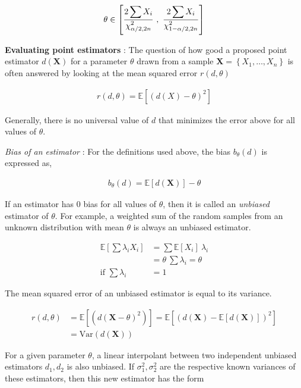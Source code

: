 \begin{align}
	\theta \in \left[\ddfrac{2 \sum X_i}{\chi^2_{\alpha/2, 2n}}\ ,\ \ddfrac{2 \sum X_i}{\chi^2_{1 - \alpha/2, 2n}}\right]
\end{align}

\textbf{Evaluating point estimators} : The question of how good a proposed point estimator $ d(\textbf{X}) $ for a parameter $ \theta $ drawn from a sample $ \textbf{X} = \left\{X_1, \dots, X_n\right\} $ is often answered by looking at the mean squared error $ r(d, \theta) $ 

\begin{align}
	r(d, \theta) = \mathbb{E}[(d(X) - \theta)^2] 
\end{align}

Generally, there is no universal value of $ d $ that minimizes the error above for all values of $ \theta $.


\textit{Bias of an estimator} : For the definitions used above, the bias $ b_{\theta}(d) $ is expressed as,

\begin{align}
	b_\theta (d) = \mathbb{E}[d(\textbf{X})] - \theta
\end{align}

If an estimator has $ 0 $ bias for all values of $ \theta $, then it is called an \textit{unbiased} estimator of $ \theta $. For example, a weighted sum of the random samples from an unknown distribution with mean $ \theta $ is always an unbiased estimator.

\begin{align}
	\mathbb{E}\left[ \sum \lambda_i X_i \right] &= \sum \mathbb{E}[X_i]\ \lambda_i \nonumber \\
	&= \theta\ \sum \lambda_i = \theta \nonumber \\
	\text{if } \sum \lambda_i &= 1
\end{align}

The mean squared error of an unbiased estimator is equal to its variance.

\begin{align}
	r(d, \theta) &= \mathbb{E}[(d(\textbf{X} - \theta)^2)] = \mathbb{E}[(d(\textbf{X}) - \mathbb{E}[d(\textbf{X})])^2] \nonumber \\
	&= \mathrm{Var}(d(\textbf{X}))
\end{align}

For a given parameter $ \theta $, a linear interpolant between two independent unbiased estimators $ d_1, d_2 $ is also unbiased. If $ \sigma_1^2, \sigma_2^2 $ are the respective known variances of these estimators, then this new estimator has the form 

